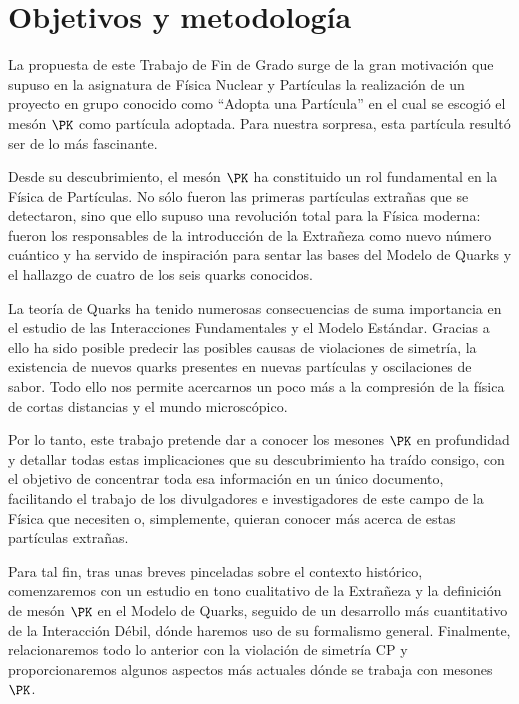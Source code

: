 \chapter*{Objetivos y metodología}
\label{cap:objetivos}

La propuesta de este Trabajo de Fin de Grado surge de la gran motivación que supuso en la asignatura de Física Nuclear y Partículas la realización de un proyecto en grupo conocido como ``Adopta una Partícula'' en el cual se escogió el mesón $\PK$ como partícula adoptada. Para nuestra sorpresa, esta partícula resultó ser de lo más fascinante.

Desde su descubrimiento, el mesón $\PK$ ha constituido un rol fundamental en la Física de Partículas. No sólo fueron las primeras partículas extrañas que se detectaron, sino que ello supuso una revolución total para la Física moderna: fueron los responsables de la introducción de la Extrañeza como nuevo número cuántico y ha servido de inspiración para sentar las bases del Modelo de Quarks y el hallazgo de cuatro de los seis quarks conocidos.

La teoría de Quarks ha tenido numerosas consecuencias de suma importancia en el estudio de las Interacciones Fundamentales y el Modelo Estándar. Gracias a ello ha sido posible predecir las posibles causas de violaciones de simetría, la existencia de nuevos quarks presentes en nuevas partículas y oscilaciones de sabor. Todo ello nos permite acercarnos un poco más a la compresión de la física de cortas distancias y el mundo microscópico. 

Por lo tanto, este trabajo pretende dar a conocer los mesones $\PK$ en profundidad y detallar todas estas implicaciones que su descubrimiento ha traído consigo, con el objetivo de concentrar toda esa información en un único documento, facilitando el trabajo de los divulgadores e investigadores de este campo de la Física que necesiten o, simplemente, quieran conocer más acerca de estas partículas extrañas. %

Para tal fin, tras unas breves pinceladas sobre el contexto histórico, comenzaremos con un estudio en tono cualitativo de la Extrañeza y la definición de mesón $\PK$ en el Modelo de Quarks, seguido de un desarrollo más cuantitativo de la Interacción Débil, dónde haremos uso de su formalismo general. Finalmente, relacionaremos todo lo anterior con la violación de simetría CP y proporcionaremos algunos aspectos más actuales dónde se trabaja con mesones $\PK$.



